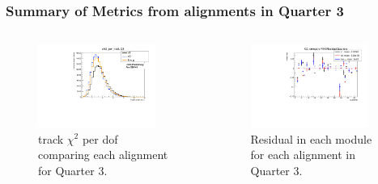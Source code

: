 \documentclass[aspectratio=1610, 12pt]{beamer}
\begin{document}
\begin{frame}\frametitle{Summary of Metrics from alignments in Quarter 3}
  \begin{columns}
    \begin{column}[c]{0.48\textwidth}
      \begin{figure}
        \centering
        \includegraphics[width=0.9\textwidth]{2023-mar-9-DPG/chi2_per_ndof_Q3.pdf}
        \caption{track $\chi^2$ per dof comparing each alignment for Quarter 3.}
      \end{figure}
    \end{column}
    \begin{column}{0.48\textwidth}
      \begin{figure}
        \includegraphics[width=0.9\textwidth]{2023-mar-9-DPG/RMSResidualQuarters_Q3.pdf}
        \caption{Residual in each module for each alignment in Quarter 3.}
      \end{figure}
    \end{column}
  \end{columns}
\end{frame}
\end{document}
